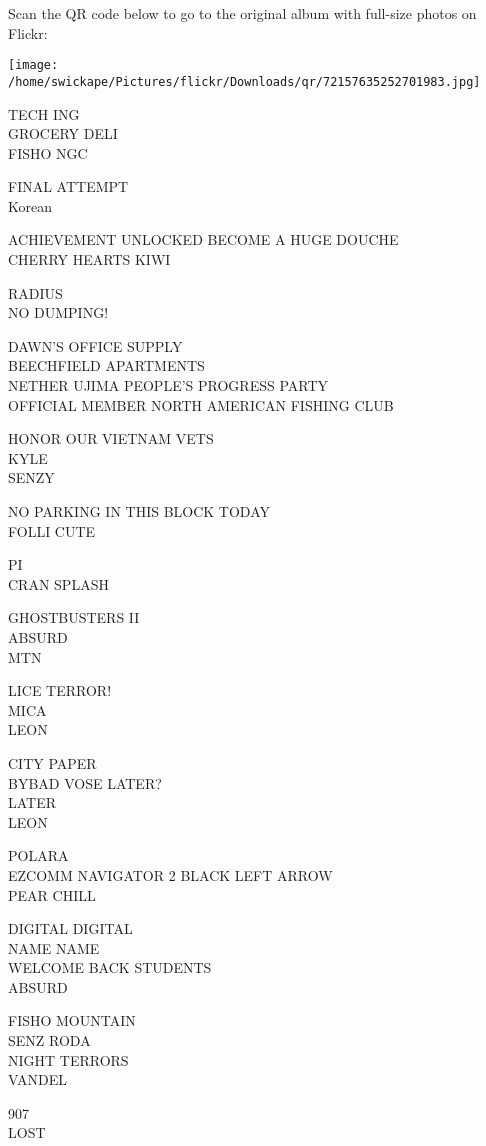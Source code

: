 \documentclass[10pt,letterpaper]{article}
\begin{document}
Scan the QR code below to go to the original album with full-size photos on Flickr:

\texttt{[image: /home/swickape/Pictures/flickr/Downloads/qr/72157635252701983.jpg]}


TECH ING\\
GROCERY DELI\\
FISHO NGC

FINAL ATTEMPT\\
Korean

ACHIEVEMENT UNLOCKED BECOME A HUGE DOUCHE\\
CHERRY HEARTS KIWI

RADIUS\\
NO DUMPING!

DAWN'S OFFICE SUPPLY\\
BEECHFIELD APARTMENTS\\
NETHER UJIMA PEOPLE'S PROGRESS PARTY\\
OFFICIAL MEMBER NORTH AMERICAN FISHING CLUB

HONOR OUR VIETNAM VETS\\
KYLE\\
SENZY

NO PARKING IN THIS BLOCK TODAY\\
FOLLI CUTE

PI\\
CRAN SPLASH

GHOSTBUSTERS II\\
ABSURD\\
MTN

LICE TERROR!\\
MICA\\
LEON

CITY PAPER\\
BYBAD VOSE LATER?\\
LATER\\
LEON

POLARA\\
EZCOMM NAVIGATOR 2 BLACK LEFT ARROW\\
PEAR CHILL

DIGITAL DIGITAL\\
NAME NAME\\
WELCOME BACK STUDENTS\\
ABSURD

FISHO MOUNTAIN\\
SENZ RODA\\
NIGHT TERRORS\\
VANDEL

907\\
LOST
\end{document}
